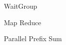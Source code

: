 \documentclass{beamer}
\begin{document}
\begin{frame} {WaitGroup}

\end{frame}

\begin{frame} {Map Reduce}
\end{frame}

\begin{frame} {Parallel Prefix Sum}
\end{frame}
\end{document}
